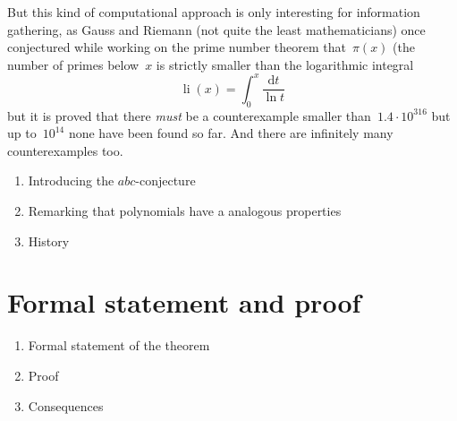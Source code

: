 \documentclass[11pt, a4paper, openany, oneside, article]{memoir}
\theoremstyle{definition}
\begin{document}
But this kind of computational approach is only interesting for information gathering, as Gauss and Riemann (not quite the least mathematicians) once conjectured while working on the prime number theorem that~$\pi(x)$ (the number of primes below~$x$ is strictly smaller than the logarithmic integral
\begin{equation}
  \operatorname{li}(x)=\int_0^x\frac{\mathrm{d}t}{\ln t}
\end{equation}
but it is proved that there \emph{must} be a counterexample smaller than~$1.4\cdot10^{316}$ but up to~$10^{14}$ none have been found so far. And there are infinitely many counterexamples too.

\begin{enumerate}
  \item Introducing the $abc$-conjecture
  \item Remarking that polynomials have a analogous properties
  \item History
\end{enumerate}


\section{Formal statement and proof}
\label{section:statement-and-proof}

\begin{enumerate}
  \item Formal statement of the theorem
  \item Proof
  \item Consequences
\end{enumerate}




\end{document}
